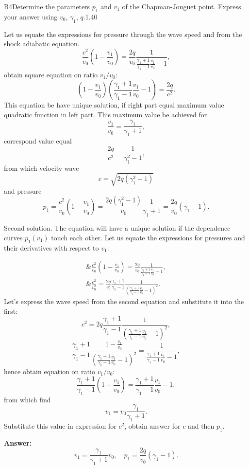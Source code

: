 \documentclass[11pt,a4paper]{article}
\begin{document}
\begin{solcard}{B4}{Determine the parameters $p_1$ and $v_1$ of the Chapman-Jouguet point. Express your answer using $v_0$, $\gamma_1$, $q$.}{1.40}

Let us equate the expressions for pressure through the wave speed and from the shock adiabatic equation. $$ \frac{c^2}{v_0} \left( 1 - \frac{v_1}{v_0}\right)= \frac{2q}{v_0} \frac{1}{\frac{\gamma_1 +1}{\gamma_1 - 1} \frac{v_1}{v_0} - 1}, $$obtain square equation on ratio $v_1/v_0$: $$ \left(1- \frac{v_1}{v_0} \right)\left( \frac{\gamma_1 +1}{\gamma_1 - 1} \frac{v_1}{v_0} - 1\right) = \frac{2q}{c^2}. $$This equation be have unique solution, if right part equal maximum value quadratic function in left part. This maximum value be achieved for $$ \frac{v_1}{v_0} = \frac{\gamma_1}{\gamma_1 + 1}, $$correspond value equal $$ \frac{2q}{c^2} = \frac{1}{\gamma_1^2 -1}, $$from which velocity wave $$ c = \sqrt{2q (\gamma_1^2 -1)} $$and pressure $$ p_1 = \frac{c^2}{v_0}\left( 1 - \frac{v_1}{v_0}\right) = \frac{2q (\gamma_1^2-1)}{v_0} \frac{1}{\gamma_1 + 1} = \frac{2q}{v_0} (\gamma_1 -1). $$


Second solution. The equation will have a unique solution if the dependence curves $p_1(v_1)$ touch each other. Let us equate the expressions for pressures and their derivatives with respect to $v_1$:


\begin{align*} \&\frac{c^2}{v_0} \left( 1 - \frac{v_1}{v_0}\right)= \frac{2q}{v_0} \frac{1}{\frac{\gamma_1 +1}{\gamma_1 - 1} \frac{v_1}{v_0} - 1},\\ \&\frac{c^2}{v_0^2} = \frac{2q}{v_0^2} \frac{\gamma_1 +1}{\gamma_1 -1}\frac{1}{\left(\frac{\gamma_1 +1}{\gamma_1 - 1} \frac{v_1}{v_0} - 1\right)^2}. \end{align*} Let's express the wave speed from the second equation and substitute it into the first: $$ c^2  = 2q \frac{\gamma_1 +1}{\gamma_1 -1}\frac{1}{\left(\frac{\gamma_1 +1}{\gamma_1 - 1} \frac{v_1}{v_0} - 1\right)^2}, $$$$ \frac{\gamma_1 +1}{\gamma_1 -1}\frac{1 - \frac{v_1}{v_0}}{\left(\frac{\gamma_1 +1}{\gamma_1 - 1} \frac{v_1}{v_0} - 1\right)^2} = \frac{1}{\frac{\gamma_1 +1}{\gamma_1 - 1} \frac{v_1}{v_0} - 1}, $$hence obtain equation on ratio $v_1/ v_0$: $$ \frac{\gamma_1 +1}{\gamma_1 -1}\left(1 - \frac{v_1}{v_0} \right) = \frac{\gamma_1 +1}{\gamma_1 - 1} \frac{v_1}{v_0} - 1, $$from which find $$ v_1 = v_0 \frac{\gamma_1}{\gamma_1 + 1}. $$Substitute this value in expression for $c^2$, obtain answer for $c$ and then $p_1$.

\par\smallskip\noindent\textbf{Answer:} $$ v_1 = \frac{\gamma_1}{\gamma_1 + 1} v_0, \quad p_1 =\frac{2q}{v_0} (\gamma_1 -1). $$
\end{solcard}
\end{document}
